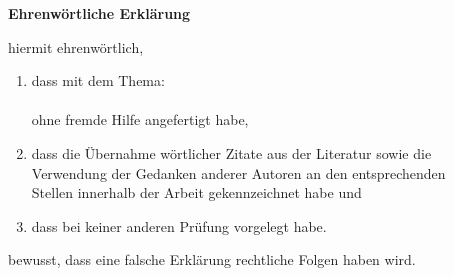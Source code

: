 \cleardoublepage
{}
\rohead{}
    \vspace*{1cm}
    \begin{center}
        \huge\textbf{Ehrenwörtliche Erklärung}\\
    \end{center}
    \vspace*{1cm}
    \normalsize
     hiermit ehrenwörtlich,

    \begin{enumerate}
        \vspace{1cm}
        \item dass  mit dem Thema:\\

        \textbf{\titel }\\

        ohne fremde Hilfe angefertigt habe,
        \item dass  die Übernahme wörtlicher Zitate aus der Literatur sowie die\\
        Verwendung der Gedanken anderer Autoren an den entsprechenden\\
        Stellen innerhalb der Arbeit gekennzeichnet habe und
        \item dass  bei keiner anderen Prüfung vorgelegt habe.\\[1,5cm]
    \end{enumerate}
     bewusst, dass eine falsche Erklärung rechtliche Folgen haben wird.\\[1,5cm]

